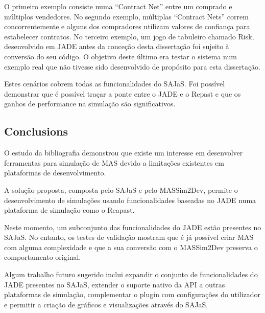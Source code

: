 \documentclass[9pt,a4paper]{extarticle}
\begin{document}
\begin{multicols}{2}
O primeiro exemplo consiste numa ``Contract Net'' entre um comprado e múltiplos vendedores. No segundo exemplo, múltiplas ``Contract Nets'' correm concorrentemente e alguns dos compradores utilizam valores de confiança para estabelecer contratos. No terceiro exemplo, um jogo de tabuleiro chamado Risk, desenvolvido em JADE antes da conceção desta dissertação foi sujeito à conversão do seu código. O objetivo deste último era testar o sistema num exemplo real que não tivesse sido desenvolvido de propósito para esta dissertação.

Estes cenários cobrem todas as funcionalidades do SAJaS. Foi possível demonstrar que é possível traçar a ponte entre o JADE e o Repast e que os ganhos de performance na simulação são significativos.

\subsection{Conclusions}
O estudo da bibliografia demonstrou que existe um interesse em desenvolver ferramentas para simulação de MAS devido a limitações existentes em plataformas de desenvolvimento.

A solução proposta, composta pelo SAJaS e pelo MASSim2Dev, permite o desenvolvimento de simulações usando funcionalidades baseadas no JADE numa plataforma de simulação como o Reapast.

Neste momento, um subconjunto das funcionalidades do JADE estão presentes no SAJaS. No entanto, os testes de validação mostram que é já possível criar MAS com alguma complexidade e que a sua conversão com o MASSim2Dev preserva o comportamento original.

Algum trabalho futuro sugerido inclui expandir o conjunto de funcionalidades do JADE presentes no SAJaS, extender o suporte nativo da API a outras plataformas de simulação, complementar o plugin com configurações do utilizador e permitir a criação de gráficos e visualizações através do SAJaS.



\end{multicols}
\end{document}
